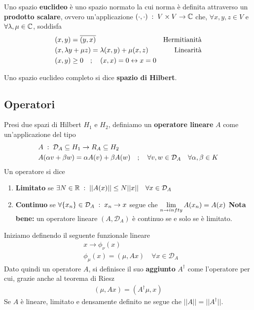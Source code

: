 Uno spazio \textbf{euclideo} è uno spazio normato la cui norma è definita attraverso un \textbf{prodotto scalare}, ovvero un'applicazione $ (\cdot , \cdot) \; : \; V \times V \rightarrow \mathbb{C} $ che, $\forall x,y,z \in V$ e $\forall \lambda, \mu \in \mathbb{C}$, soddisfa
\begin{align}
	&(x,y) = \overline{(y,x)} \quad &\text{Hermitianità}\\
	&(x, \lambda y + \mu z) = \lambda(x,y) + \mu (x,z) \quad &\text{Linearità}\\
	&(x,y) \geq 0 \quad ; \quad (x,x) = 0 \leftrightarrow x=0
\end{align}

Uno spazio euclideo completo si dice \textbf{spazio di Hilbert}.

\subsection{Operatori}

Presi due spazi di Hilbert $H_1$ e $H_2$, definiamo un \textbf{operatore lineare} $A$ come un'applicazione del tipo
\begin{align}
	&A \; : \; \mathcal{D}_A \subseteq H_1 \rightarrow R_A \subseteq H_2 \\
	&A(\alpha v + \beta w) = \alpha A(v) + \beta A(w) \quad ; \quad \forall v,w \in \mathcal{D}_A \quad \forall \alpha, \beta \in K
\end{align}
Un operatore si dice
\begin{enumerate}
	\item \textbf{Limitato} se $\exists N\in \mathbb{R} \; : \; ||A(x)|| \leq N||x|| \quad \forall x \in \mathcal{D}_A$
	\item \textbf{Continuo} se $\forall \{ x_n\} \in \mathcal{D}_A \; : \; x_n \rightarrow x$ segue che $\underset{n \rightarrow infty}{\lim} \, A(x_n) = A(x)$
	\textbf{Nota bene:} un operatore lineare $(A,\mathcal{D}_A)$ è continuo se e solo se è limitato.
\end{enumerate}

\newpage

Iniziamo definendo il seguente funzionale lineare
\begin{align}
	&x \rightarrow \phi_\nu(x)\\
	&\phi_\mu(x) = (\mu, Ax) \quad \forall x \in \mathcal{D}_A
\end{align}
Dato quindi un operatore $A$, si definisce il suo \textbf{aggiunto} $A^\dagger$ come l'operatore per cui, grazie anche al teorema di Riesz
\begin{align}
	(\mu, Ax) = (A^\dagger \mu, x)
\end{align}
Se $A$ è lineare, limitato e densamente definito ne segue che $||A|| = ||A^\dagger||$.

